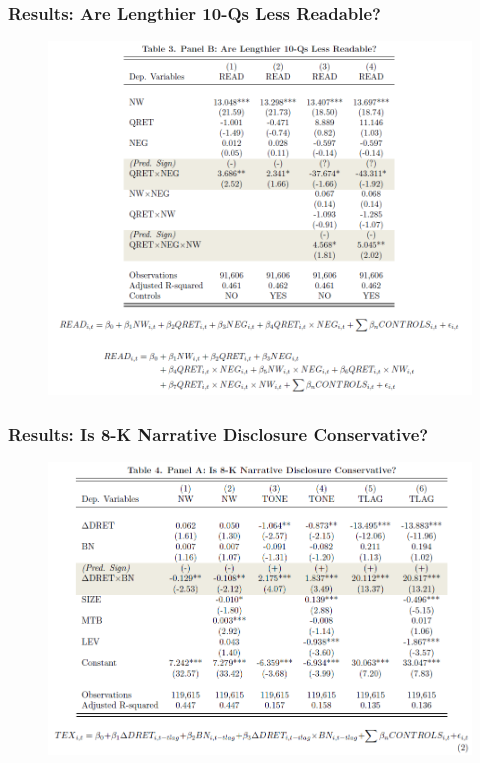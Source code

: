 \documentclass{beamer}
\begin{document}
\begin{frame}
\frametitle{Results: Are Lengthier 10-Qs Less Readable?}
	\begin{figure}[h]
	\centering
	\includegraphics[width=0.9\linewidth]{tab3panB}
	\label{tab3panB}
	\end{figure}
\end{frame}
\begin{frame}
\frametitle{Results: Is 8-K Narrative Disclosure Conservative?}
	\begin{figure}[h]
	\centering
	\includegraphics[width=0.9\linewidth]{tab4panA}
	\label{tab4panA}
	\end{figure}
\end{frame}
\end{document}
